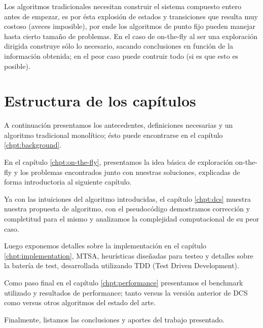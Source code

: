 Los algoritmos tradicionales necesitan construir el sistema compuesto entero antes de empezar, es por ésta explosión de estados y transiciones que resulta muy costoso (aveces imposible), por ende los algoritmos de punto fijo pueden manejar hasta cierto tamaño de problemas. En el caso de on-the-fly al ser una exploración dirigida construye sólo lo necesario, sacando conclusiones en función de la información obtenida; en el peor caso puede contruir todo (si es que esto es posible).

\section{Estructura de los capítulos}

A continuación presentamos los antecedentes, definiciones necesarias y un algoritmo tradicional monolítico; ésto puede encontrarse en el capítulo \ref{chpt:background}.

En el capítulo \ref{chpt:on-the-fly}, presentamos la idea básica de exploración on-the-fly y los problemas encontrados junto con nuestras soluciones, explicadas de forma introductoria al siguiente capítulo.

Ya con las intuiciones del algoritmo introducidas, el capítulo \ref{chpt:dcs} muestra nuestra propuesta de algoritmo, con el pseudocódigo demostramos corrección y completitud para el mismo y analizamos la complejidad computacional de su peor caso.

Luego exponemos detalles sobre la implementación en el capítulo \ref{chpt:implementation}, MTSA, heurísticas diseñadas para testeo y detalles sobre la batería de test, desarrollada utilizando TDD (Test Driven Development).

Como paso final en el capítulo \ref{chpt:performance} presentamos el benchmark utilizado y resultados de performance; tanto versus la versión anterior de DCS como versus otros algoritmos del estado del arte.

Finalmente, listamos las conclusiones y aportes del trabajo presentado.









